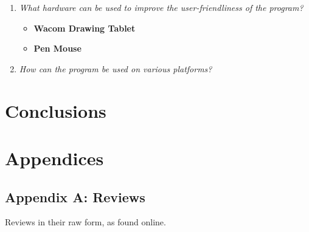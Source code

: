 \documentclass[a4paper,12pt]{article}
\begin{document}
\begin{enumerate}
\item \textit{What hardware can be used to improve the user-friendliness of the program?}\\

  \begin{itemize}
  \item \textbf{Wacom Drawing Tablet}
  \item \textbf{Pen Mouse}
  \end{itemize}
  
\item \textit{How can the program be used on various platforms?}\\
  
\end{enumerate}

\section{Conclusions}

\newpage
\section{Appendices}

\subsection{Appendix A: Reviews}

Reviews in their raw form, as found online. 
\end{document}
